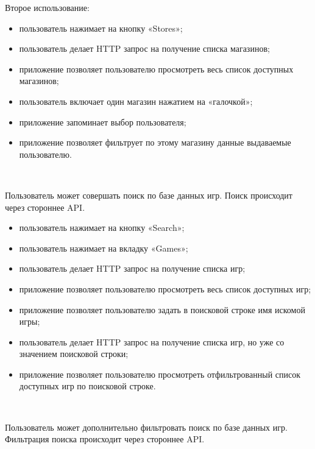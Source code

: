 Второе использование:

\begin{itemize}
  \item пользователь нажимает на кнопку «Stores»;
  \item пользователь делает HTTP запрос на получение списка магазинов;
  \item приложение позволяет пользователю просмотреть весь список доступных магазинов;
  \item пользователь включает один магазин нажатием на «галочкой»;
  \item приложение запоминает выбор пользователя;
  \item приложение позволяет фильтрует по этому магазину данные выдаваемые пользователю.
\end{itemize}

~\par

Пользователь может совершать поиск по базе данных игр. Поиск происходит через стороннее API.

\begin{itemize}
  \item пользователь нажимает на кнопку «Search»;
  \item пользователь нажимает на вкладку «Games»;
  \item пользователь делает HTTP запрос на получение списка игр;
  \item приложение позволяет пользователю просмотреть весь список доступных игр;
  \item приложение позволяет пользователю задать в поисковой строке имя искомой игры;
  \item пользователь делает HTTP запрос на получение списка игр, но уже со значением поисковой строки;
  \item приложение позволяет пользователю просмотреть отфильтрованный список доступных игр по поисковой строке.
\end{itemize}

~\par

Пользователь может дополнительно фильтровать поиск по базе данных игр. Фильтрация поиска происходит через стороннее API.


